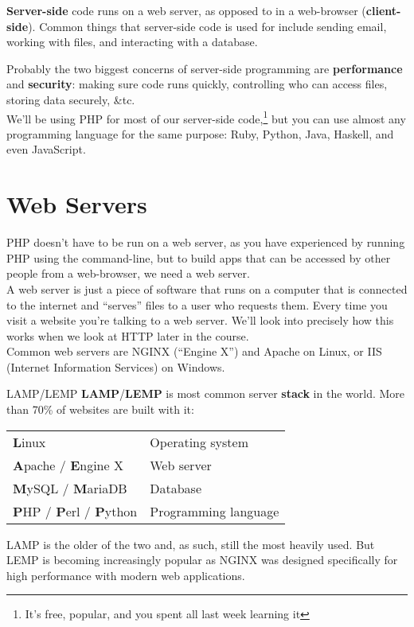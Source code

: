 \textbf{Server-side} code runs on a web server, as opposed to in a web-browser (\textbf{client-side}). Common things that server-side code is used for include sending email, working with files, and interacting with a database.


Probably the two biggest concerns of server-side programming are \textbf{performance} and \textbf{security}: making sure code runs quickly, controlling who can access files, storing data securely, \&tc.
\\

We'll be using PHP for most of our server-side code,\footnote{It's free, popular, and you spent all last week learning it} but you can use almost any programming language for the same purpose: Ruby, Python, Java, Haskell, and even JavaScript.


\section{Web Servers}

PHP doesn't have to be run on a web server, as you have experienced by running PHP using the command-line, but to build apps that can be accessed by other people from a web-browser, we need a web server.
\\

A web server is just a piece of software that runs on a computer that is connected to the internet and ``serves'' files to a user who requests them. Every time you visit a website you're talking to a web server. We'll look into precisely how this works when we look at HTTP later in the course.
\\

Common web servers are NGINX (``Engine X'') and Apache on Linux, or IIS (Internet Information Services) on Windows.

\begin{infobox}{LAMP/LEMP}
    \textbf{LAMP}/\textbf{LEMP} is most common server \textbf{stack} in the world. More than 70\% of websites are built with it:
    \\

    \begin{tabu}{l X}
        \textbf{L}inux  &   Operating system \\
        \textbf{A}pache / \textbf{E}ngine X   &   Web server \\
        \textbf{M}ySQL / \textbf{M}ariaDB &   Database \\
        \textbf{P}HP / \textbf{P}erl / \textbf{P}ython    &   Programming language \\
    \end{tabu}

    \par\bigskip

    LAMP is the older of the two and, as such, still the most heavily used. But LEMP is becoming increasingly popular as NGINX was designed specifically for high performance with modern web applications.
\end{infobox}

